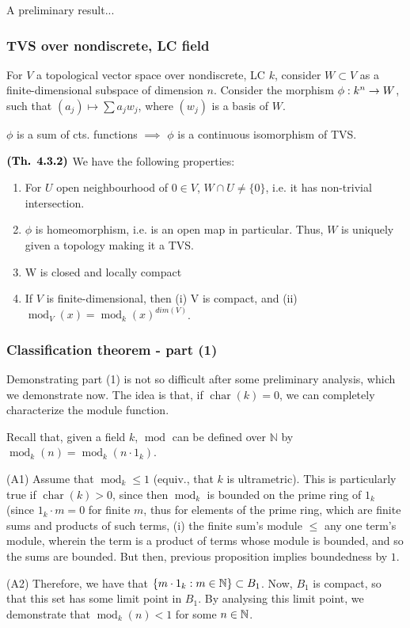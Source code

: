 \documentclass{article}
\DeclareMathOperator{\modl}{mod}
\DeclareMathOperator{\chars}{char}
\begin{document}
A preliminary result...

\subsubsection*{TVS over nondiscrete, LC field}
For $V$ a topological vector space over nondiscrete, LC $k$, consider $W \subset V$ as a finite-dimensional subspace of dimension $n$. Consider the morphism $\phi: k^n \rightarrow W$, such that $(a_j) \mapsto \sum a_j w_j$, where $(w_j)$ is a basis of $W$.

$\phi$ is a sum of cts. functions $\implies$ $\phi$ is a continuous isomorphism of TVS.

$\textbf{(Th. 4.3.2)}$ We have the following properties:
\begin{enumerate}
    \item For $U$ open neighbourhood of $0 \in V$, $W \cap U \ne \{0\}$, i.e. it has non-trivial intersection.
    \item $\phi$ is homeomorphism, i.e. is an open map in particular. Thus, $W$ is uniquely given a topology making it a TVS.
    \item W is closed and locally compact
    \item If $V$ is finite-dimensional, then (i) V is compact, and (ii) $\modl_V(x) = \modl_{k}(x)^{dim(V)}$.
\end{enumerate}

\subsubsection{Classification theorem - part (1)}
Demonstrating part (1) is not so difficult after some preliminary analysis, which we demonstrate now. The idea is that, if $\chars(k) = 0$, we can completely characterize the module function. 

Recall that, given a field $k$, $\modl$ can be defined over $\mathbb{N}$ by $\modl_k(n) = \modl_k(n\cdot 1_k)$.

(A1) Assume that $\modl_{k} \leq 1$ (equiv., that $k$ is ultrametric). This is particularly true if $\chars(k) > 0$, since then $\modl_k$ is bounded on the prime ring of $1_k$ (since $1_k \cdot m = 0$ for finite $m$, thus for elements of the prime ring, which are finite sums and products of such terms, (i) the finite sum's module $\leq$ any one term's module, wherein the term is a product of terms whose module is bounded, and so the sums are bounded. But then, previous proposition implies boundedness by $1$.

(A2) Therefore, we have that $\{m\cdot 1_k : m \in \mathbb{N}\} \subset B_1$. Now, $B_1$ is compact, so that this set has some limit point in $B_1$. By analysing this limit point, we demonstrate that $\modl_k(n) < 1$ for some $n \in \mathbb{N}$.
\end{document}
